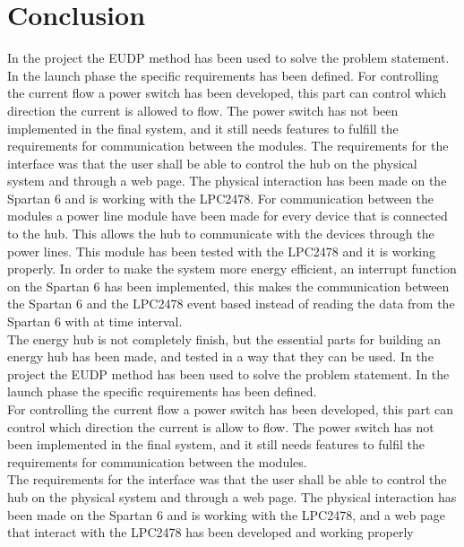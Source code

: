 \chapter{Conclusion}
In the project the EUDP method has been used to solve the problem statement. In the launch phase the specific requirements has been defined. For controlling the current flow a power switch has been developed, this part can control which direction the current is allowed to flow. The power switch has not been implemented in the final system, and it still needs features to fulfill the requirements for communication between the modules. The requirements for the interface was that the user shall be able to control the hub on the physical system and through a web page. The physical interaction has been made on the Spartan 6 and is working with the LPC2478. For communication between the modules a power line module have been made for every device that is connected to the hub. This allows the hub to communicate with the devices through the power lines. This module has been tested with the LPC2478 and it is working properly. In order to make the system more energy efficient, an interrupt function on the Spartan 6 has been implemented, this makes the communication between the Spartan 6 and the LPC2478 event based instead of reading the data from the Spartan 6 with at time interval.\\
The energy hub is not completely finish, but the essential parts for building an energy hub has been made, and tested in a way that they can be used.
%
In the project the EUDP method has been used to solve the problem statement. In the launch phase the specific requirements has been defined.\\
For controlling the current flow a power switch has been developed, this part can control which direction the current is allow to flow. The power switch has not been implemented in the final system, and it still needs features to fulfil the requirements for communication between the modules.\\
The requirements for the interface was that the user shall be able to control the hub on the physical system and through a web page. The physical interaction has been made on the Spartan 6 and is working with the LPC2478, and a web page that interact with the LPC2478 has been developed and working properly\\
